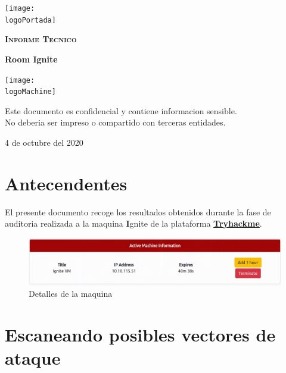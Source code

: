 \documentclass[a4paper]{article}%
\newcommand{\logoPortada}{images/logo_thm.png}
\newcommand{\machineName}{Ignite} %
\newcommand{\logoMachine}{images/maquina_logo.jpg} %
\newcommand{\startDate}{4 de octubre del 2020}
\begin{document}
	\cfoot{\thepage}
	\begin{titlepage}
	\centering
	\texttt{[image: \\logoPortada]}\par\vspace{1cm}
	{\scshape\LARGE \textbf{Informe Tecnico}\par }
	\vspace{0.2cm}
	{\Huge\bfseries\textcolor{greenPortada}{Room \machineName}\par}
	\vfill\vfill
	\texttt{[image: \\logoMachine]}\par\vspace{1cm}
	\vfill
	\begin{tcolorbox}[colback=red!5!white,colframe=red!75!black]
		\centering
		Este documento es confidencial y contiene informacion sensible.\\No deberia
		ser impreso o compartido con terceras entidades.
	\end{tcolorbox}	
	\vfill
	{\large \startDate\par}
	\vfill
	\end{titlepage}
	\clearpage
	\tableofcontents
	\clearpage
	\section{Antecendentes}
	El presente documento recoge los resultados obtenidos durante la fase de auditoria
	realizada a la maquina {\textbf\machineName} de la plataforma 
	\href{https://tryhackme.com}{\textbf{Tryhackme}}. 
	\vspace{0.2cm}

	\begin{figure}[h]
	\centering
	\includegraphics[width=\textwidth]{images/informacion_maquina.jpg}
	\caption{Detalles de la maquina}
	\end{figure}
	
	\vspace{0.5cm}

	\section{Escaneando posibles vectores de ataque}
\end{document}
